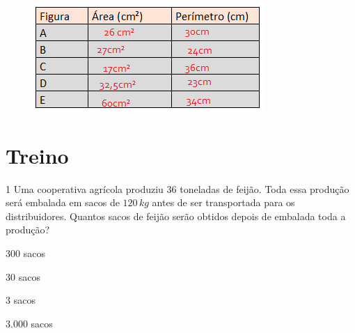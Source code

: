 \begin{figure}[h]
\centering\includegraphics[width=3.44792in,height=1.58333in]{./imgSAEB_6_MAT/media/image99.png}
\end{figure}

\section{Treino}

\num{1}  Uma cooperativa agrícola produziu $36$ toneladas de feijão. Toda essa
produção será embalada em sacos de $120\,kg$ antes de ser transportada para
os distribuidores. Quantos sacos de feijão serão obtidos depois de
embalada toda a produção?

\begin{multicols}{2}
\begin{escolha}
\item $300$ sacos
\item $30$ sacos
\item $3$ sacos
\item $3.000$ sacos
\end{escolha}
\end{multicols}




